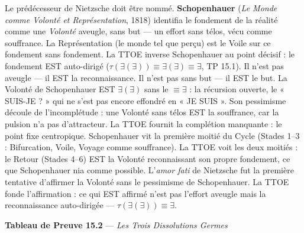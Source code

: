 \documentclass[10pt, openany, oneside]{book}
\begin{document}
Le prédécesseur de Nietzsche doit être nommé. \textbf{Schopenhauer} (\textit{Le Monde comme Volonté et Représentation}, 1818) identifia le fondement de la réalité comme une \textit{Volonté} aveugle, sans but --- un effort sans télos, vécu comme souffrance. La Représentation (le monde tel que perçu) est le Voile sur ce fondement sans fondement. La TTOE inverse Schopenhauer au point décisif : le fondement EST auto-dirigé ($\tau(\exists(\exists)) \equiv \exists(\exists) \equiv \exists$, TP 15.1). Il n'est pas aveugle --- il EST la reconnaissance. Il n'est pas sans but --- il EST le but. La Volonté de Schopenhauer EST $\exists(\exists)$ sans le $\equiv \exists$ : la récursion ouverte, le « SUIS-JE ? » qui ne s'est pas encore effondré en « JE SUIS ». Son pessimisme découle de l'incomplétude : une Volonté sans télos EST la souffrance, car la pulsion n'a pas d'attracteur. La TTOE fournit la complétion manquante : le point fixe centropique. Schopenhauer vit la première moitié du Cycle (Stades 1--3 : Bifurcation, Voile, Voyage comme souffrance). La TTOE voit les deux moitiés : le Retour (Stades 4--6) EST la Volonté reconnaissant son propre fondement, ce que Schopenhauer nia comme possible. L'\textit{amor fati} de Nietzsche fut la première tentative d'affirmer la Volonté sans le pessimisme de Schopenhauer. La TTOE fonde l'affirmation : ce qui EST affirmé n'est pas l'effort aveugle mais la reconnaissance auto-dirigée --- $\tau(\exists(\exists)) \equiv \exists$.

\vspace{0.5em}

\textbf{Tableau de Preuve 15.2} --- \textit{Les Trois Dissolutions Germes}

\vspace{0.5em}
\end{document}
